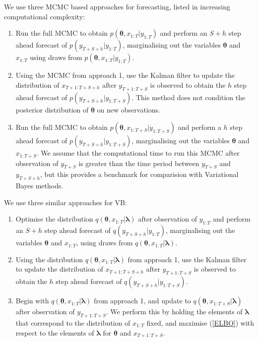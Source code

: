 \documentclass[12pt,a4paper]{article}%
\numberwithin{equation}{section}
\begin{document}
We use three MCMC based approaches for forecasting, listed in increasing computational complexity:
\begin{enumerate}
\item Run the full MCMC to obtain $p(\boldsymbol{\theta}, x_{1:T} | y_{1:T})$ and perform an $S+h$ step ahead forecast of $p(y_{T+S+h} | y_{1:T})$, marginalising out the variables $\boldsymbol{\theta}$ and $x_{1:T}$ using draws from $p(\boldsymbol{\theta}, x_{1:T} | y_{1:T})$.
\item Using the MCMC from approach 1, use the Kalman filter to update the distribution of $x_{T+1:T+S+h}$ after $y_{T+1:T+S}$ is observed to obtain the $h$ step ahead forecast of $p(y_{T+S+h} | y_{1:T+S})$. This method does not condition the posterior distribution of $\boldsymbol{\theta}$ on new observations.
\item Run the full MCMC to obtain $p(\boldsymbol{\theta}, x_{1:T+S} | y_{1:T+S})$ and perform a $h$ step ahead forecast of $p(y_{T+S+h} | y_{1:T+S})$, marginalising out the variables $\boldsymbol{\theta}$ and $x_{1:T+S}$. We assume that the computational time to run this MCMC after observation of $y_{T+S}$ is greater than the time period between $y_{T+S}$ and $y_{T+S+h}$, but this provides a benchmark for comparision with Variational Bayes methods.
\end{enumerate}

We use three similar approaches for VB:
\begin{enumerate}
\item Optimise the distribution $q(\boldsymbol{\theta}, x_{1:T} | \boldsymbol{\lambda})$ after observation of $y_{1:T}$ and perform an $S+h$ step ahead forecast of $q(y_{T+S+h} | y_{1:T})$, marginalising out the variables $\boldsymbol{\theta}$ and $x_{1:T}$, using draws from $q(\boldsymbol{\theta}, x_{1:T} | \boldsymbol{\lambda})$.
\item Using the distribution $q(\boldsymbol{\theta}, x_{1:T} | \boldsymbol{\lambda})$ from approach 1, use the Kalman filter to update the distribution of $x_{T+1:T+S+h}$ after $y_{T+1:T+S}$ is observed to obtain the $h$ step ahead forecast of $q(y_{T+S+h} | y_{1:T+S})$. 
\item Begin with $q(\boldsymbol{\theta}, x_{1:T} | \boldsymbol{\lambda})$ from approach 1, and update to  $q(\boldsymbol{\theta}, x_{1:T+S} | \boldsymbol{\lambda})$ after observation of $y_{T+1:T+S}$. We perform this by holding the elements of $\boldsymbol{\lambda}$ that correspond to the distribution of $x_{1:T}$ fixed, and maximise (\ref{ELBO}) with respect to the elements of $\boldsymbol{\lambda}$ for $\boldsymbol{\theta}$ and $x_{T+1:T+S}$.
\end{enumerate}
\end{document}
